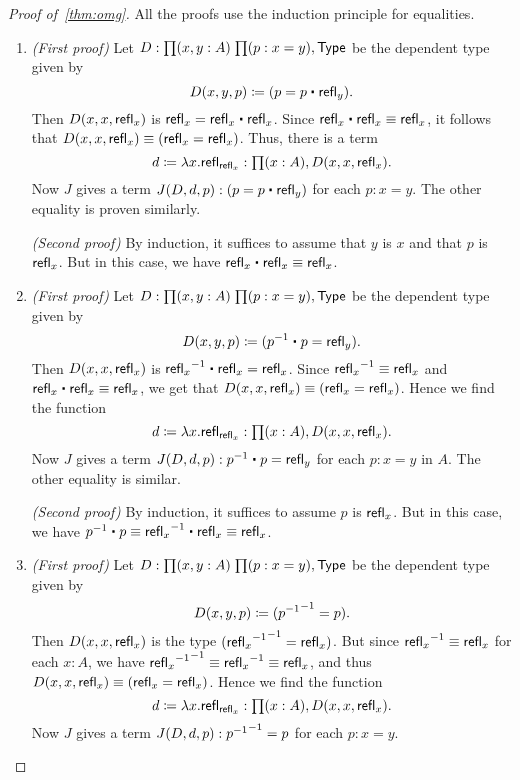 \begin{proof}[Proof of~\autoref{thm:omg}]
  All the proofs use the induction principle for equalities.
  \begin{enumerate}
  \item \emph{(First proof)} Let $D:\prd{x,y:A}{p:x=y} \type$ be the dependent type given by 
    \begin{equation*}
      D(x,y,p)\defeq (p= p\ct \refl{y}).
    \end{equation*}
    Then $D(x,x,\mathsf{refl}_{x})$ is $\refl{x}=\refl{x}\ct\refl{x}$.
    Since $\refl{x}\ct\refl{x}\jdeq\refl{x}$, it follows that $D(x,x,\mathsf{refl}_{x})\equiv (\mathsf{refl}_{x}=\mathsf{refl}_{x})$.
    Thus, there is a term
    \begin{equation*}
      d\defeq\lambda x.\refl{\refl{x}}:\prd{x:A} D(x,x,\refl{x}).
    \end{equation*}
    Now $J$ gives a term $J(D,d,p):(p= p\ct\refl{y})$ for each $p:x= y$.
    The other equality is proven similarly.

    \noindent
    \emph{(Second proof)} By induction, it suffices to assume that $y$ is $x$ and that $p$ is $\mathsf{refl}_{x}$.
    But in this case, we have $\refl{x}\ct\refl{x}\jdeq\refl{x}$.
  \item \emph{(First proof)} Let $D:\prd{x,y:A}{p:x=y} \type$ be the dependent type given by 
    \begin{equation*}
      D(x,y,p)\defeq (\opp{p}\ct p=  \refl{y}).
    \end{equation*}
    Then $D(x,x,\mathsf{refl}_{x})$ is $\opp{\refl{x}}\ct\refl{x}=\refl{x}$.
    Since $\mathord{{\mathsf{refl}_{x}}^{-1}}\equiv\mathsf{refl}_{x}$ and $\refl{x}\ct\refl{x}\jdeq\refl{x}$, we get that $D(x,x,\mathsf{refl}_{x})\equiv (\mathsf{refl}_{x}=\mathsf{refl}_{x})$.
    Hence we find the function
    \begin{equation*}
      d\defeq\lambda x.\refl{\refl{x}}:\prd{x:A} D(x,x,\refl{x}).
    \end{equation*}
    Now $J$ gives a term $J(D,d,p):\opp{p}\ct p=\refl{y}$ for each $p:x= y$ in $A$.
    The other equality is similar.

    \noindent \emph{(Second proof)} By induction, it suffices to assume $p$ is $\mathsf{refl}_{x}$.
    But in this case, we have $\opp{p} \ct p \jdeq \opp{\refl x} \ct \refl x \jdeq \refl x$.
  \item \emph{(First proof)} Let $D:\prd{x,y:A}{p:x=y} \type$ be the dependent type given by
    \begin{equation*}
      D(x,y,p)\coloneqq (\mathord{{\mathord{{p}^{-1}}}^{-1}}= p).
    \end{equation*}
    Then $D(x,x,\mathsf{refl}_{x})$ is the type $(\mathord{{\mathord{{\mathsf{refl}_{x}}^{-1}}}^{-1}}=\mathsf{refl}_{x})$.
    But since $\mathord{{\mathsf{refl}_{x}}^{-1}}\equiv \mathsf{refl}_{x}$ for each $x:A$, we have $\mathord{{\mathord{{\mathsf{refl}_{x}}^{-1}}}^{-1}}\equiv \mathord{{\mathsf{refl}_{x}}^{-1}} \equiv\mathsf{refl}_{x}$, and thus $D(x,x,\mathsf{refl}_{x})\equiv(\mathsf{refl}_{x}=\mathsf{refl}_{x})$.
    Hence we find the function
    \begin{equation*}
      d\defeq\lambda x.\refl{\refl{x}}:\prd{x:A} D(x,x,\refl{x}).
    \end{equation*}
    Now $J$ gives a term $J(D,d,p):\mathord{{\mathord{{p}^{-1}}}^{-1}}= p$ for each $p:x= y$.


\end{enumerate}
\end{proof}

